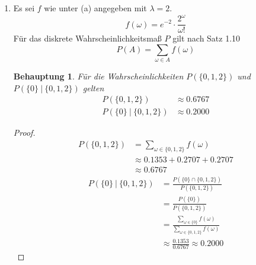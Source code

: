 \documentclass[a4paper]{scrartcl}
\newtheorem*{behaupt}{Behauptung}
\begin{document}
\begin{enumerate}[label=\bfseries\arabic*.]
\begin{enumerate}[label=(\alph*)]
            \item
                Es sei $f$ wie unter (a) angegeben mit $\lambda = 2$.
                \begin{equation*}
                    f(\omega) = e^{-2} \cdot \frac{2^\omega}{\omega!}
                \end{equation*}
                Für das diskrete Wahrscheinlichkeitsmaß $P$ gilt nach Satz 1.10
                \begin{equation*}
                    P(A) = \sum_{\omega \in A} f(\omega)
                \end{equation*}
                \begin{behaupt}
                    Für die Wahrscheinlichkeiten $P(\{0, 1, 2\})$ und
                    $P(\{0\}\ |\ \{0, 1, 2\})$ gelten
                    \begin{align*}
                        P(\{0, 1, 2\}) &\approx \num{0,6767} \\
                        P(\{0\}\ |\ \{0, 1, 2\}) &\approx \num{0,2000}
                    \end{align*}
                \end{behaupt}
                \begin{proof}
                    \begin{equation*}
                        \begin{split}
                            P(\{0, 1, 2\}) &=
                            \sum_{\omega \in \{0, 1, 2\}} f(\omega) \\
                            &\approx \num{0,1353} + \num{0,2707} + \num{0.2707}
                            \\
                            &\approx \num{0,6767}
                        \end{split}
                    \end{equation*}
                    \begin{equation*}
                        \begin{split}
                            P(\{0\}\ |\ \{0, 1, 2\})
                            &= \frac{P(\{0\} \cap \{0, 1, 2\})}{P(\{0, 1, 2\})}
                            \\
                            &= \frac{P(\{0\})}{P(\{0, 1, 2\})} \\
                            &= \frac{\sum\limits_{\omega \in \{0\}} f(\omega)}
                                {\sum\limits_{\omega \in \{0, 1, 2\}} f(\omega)}
                                \\
                            &\approx \frac{\num{0.1353}}{\num{0.6767}}
                            \approx \num{0,2000}
                        \end{split}
                    \end{equation*}
                \end{proof}

        \end{enumerate}

\end{enumerate}
\end{document}
